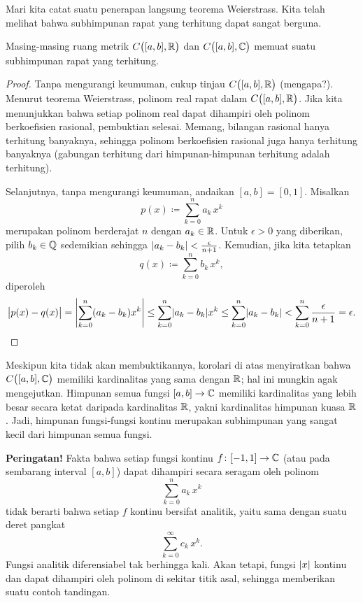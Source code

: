 Mari kita catat suatu penerapan langsung teorema Weierstrass. Kita telah
melihat bahwa subhimpunan rapat yang terhitung dapat sangat berguna.

\begin{cor}
Masing-masing ruang metrik $C\bigl([a,b],{\mathbb{R}}\bigr)$ dan $C\bigl([a,b],{\mathbb{C}}\bigr)$ memuat suatu subhimpunan rapat yang terhitung.
\end{cor}

\begin{proof}
Tanpa mengurangi keumuman, cukup tinjau
$C\bigl([a,b],{\mathbb{R}}\bigr)$
(mengapa?).
Menurut teorema Weierstrass, polinom real rapat dalam $C\bigl([a,b],{\mathbb{R}}\bigr)$.
Jika kita menunjukkan bahwa
setiap polinom real dapat dihampiri oleh polinom berkoefisien
rasional, pembuktian selesai.
Memang, bilangan rasional hanya terhitung banyaknya, sehingga polinom
berkoefisien rasional juga hanya terhitung banyaknya (gabungan terhitung dari
himpunan-himpunan terhitung adalah terhitung).

Selanjutnya, tanpa mengurangi keumuman, andaikan $[a,b]=[0,1]$. Misalkan
\begin{equation*}
p(x) \coloneqq \sum_{k=0}^n a_k\,  x^k
\end{equation*}
merupakan polinom berderajat $n$ dengan $a_k \in {\mathbb{R}}$. Untuk $\epsilon > 0$
yang diberikan, pilih $b_k \in {\mathbb{Q}}$ sedemikian sehingga
$\lvert {a_k-b_k} \rvert < \frac{\epsilon}{n+1}$. Kemudian, jika kita tetapkan
\begin{equation*}
q(x) \coloneqq \sum_{k=0}^n b_k \, x^k ,
\end{equation*}
diperoleh
\begin{equation*}
\bigl\lvert {p(x)-q(x)} \bigr\rvert
=
\left\lvert {\sum_{k=0}^n (a_k-b_k) x^k} \right\rvert
\leq
\sum_{k=0}^n \lvert {a_k-b_k} \rvert x^k
\leq
\sum_{k=0}^n \lvert {a_k-b_k} \rvert
<
\sum_{k=0}^n \frac{\epsilon}{n+1} = \epsilon . \qedhere
\end{equation*}
\end{proof}

\begin{remark}
Meskipun kita tidak akan membuktikannya, korolari di atas menyiratkan bahwa
$C\bigl([a,b],{\mathbb{C}}\bigr)$ memiliki kardinalitas yang sama dengan ${\mathbb{R}}$; hal ini
mungkin agak mengejutkan. Himpunan semua fungsi $[a,b] \to {\mathbb{C}}$ memiliki
kardinalitas yang lebih besar secara ketat daripada kardinalitas ${\mathbb{R}}$, yakni
kardinalitas himpunan kuasa ${\mathbb{R}}$. Jadi, himpunan fungsi-fungsi kontinu
merupakan subhimpunan yang sangat kecil dari himpunan semua fungsi.
\end{remark}

\textbf{Peringatan!}
Fakta bahwa setiap fungsi kontinu $f \colon [-1,1] \to {\mathbb{C}}$ (atau pada sembarang
interval $[a,b]$) dapat dihampiri secara seragam oleh polinom
\begin{equation*}
\sum_{k=0}^n a_k\,  x^k
\end{equation*}
tidak berarti bahwa setiap $f$ kontinu bersifat analitik, yaitu sama dengan
suatu deret pangkat
\begin{equation*}
\sum_{k=0}^\infty c_k\,  x^k .
\end{equation*}
Fungsi analitik diferensiabel tak berhingga kali. Akan tetapi,
fungsi $\lvert {x} \rvert$ kontinu dan dapat dihampiri oleh polinom di sekitar titik asal,
sehingga memberikan suatu contoh tandingan.

